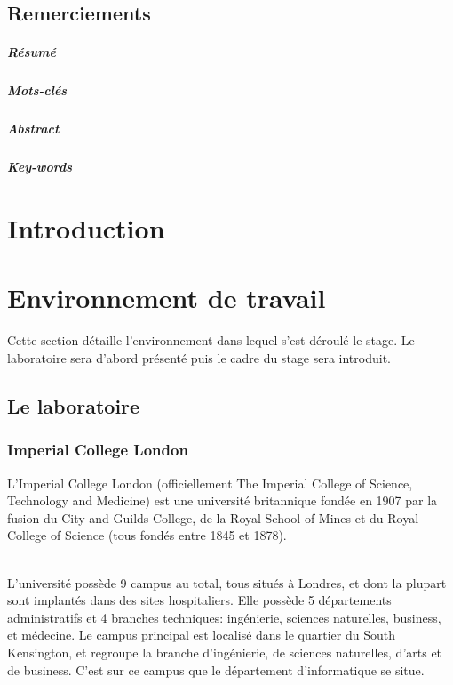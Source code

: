 \documentclass[10pt]{report}
\begin{document}
\section*{Remerciements}\newpage
\paragraph*{Résumé} %
\paragraph*{Mots-clés}
\paragraph*{Abstract}
\paragraph*{Key-words}

\renewcommand\contentsname{Sommaire}
\tableofcontents

\newpage

\chapter*{Introduction}

\chapter{Environnement de travail} 
	Cette section détaille l'environnement dans lequel s'est déroulé le stage. Le laboratoire sera d'abord présenté puis le cadre du stage sera introduit.
	\section{Le laboratoire}
	
	\subsection{Imperial College London} 
	L’Imperial College London (officiellement The Imperial College of Science, Technology and Medicine) est une université britannique fondée en 1907 par la fusion du City and Guilds College, de la Royal School of Mines et du Royal College of Science (tous fondés entre 1845 et 1878).\\ ~\par
    L'université possède 9 campus au total, tous situés à Londres, et dont la plupart sont implantés dans des sites hospitaliers.  
    Elle possède 5 départements administratifs et 4 branches techniques: ingénierie, sciences naturelles, business, et médecine.	Le campus principal est localisé dans le quartier du South Kensington, et regroupe la branche d'ingénierie, de sciences naturelles, d'arts et de business. C'est sur ce campus que le département d'informatique se situe. 
    
\end{document}
